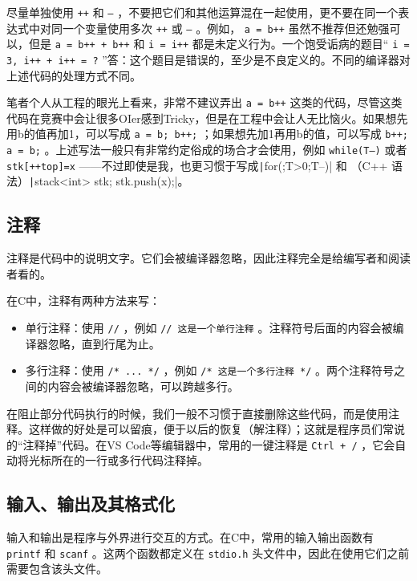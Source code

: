 \begin{caution}
  尽量单独使用 \texttt{++} 和 \texttt{--} ，不要把它们和其他运算混在一起使用，更不要在同一个表达式中对同一个变量使用多次 \texttt{++} 或 \texttt{--} 。例如， \texttt{a = b++} 虽然不推荐但还勉强可以，但是 \texttt{a = b++ + b++} 和 \texttt{i = i++} 都是未定义行为。一个饱受诟病的题目“ \texttt{i = 3, i++ + i++ = ?} ”答：这个题目是错误的，至少是不良定义的。不同的编译器对上述代码的处理方式不同。

  笔者个人从工程的眼光上看来，非常不建议弄出 \texttt{a = b++} 这类的代码，尽管这类代码在竞赛中会让很多OIer感到Tricky，但是在工程中会让人无比恼火。如果想先用b的值再加1，可以写成 \texttt{a = b; b++;} ；如果想先加1再用b的值，可以写成 \texttt{b++; a = b;} 。上述写法一般只有非常约定俗成的场合才会使用，例如 \texttt{while(T--)} 或者 \texttt{stk[++top]=x} ——不过即使是我，也更习惯于写成\texttt|for(;T>0;T--)| 和 （C++ 语法）\texttt|stack<int> stk; stk.push(x);|。
\end{caution}

\subsection{注释}

注释是代码中的说明文字。它们会被编译器忽略，因此注释完全是给编写者和阅读者看的。

在C中，注释有两种方法来写：
\begin{itemize}
  \item 单行注释：使用 \texttt{//} ，例如 \texttt{// 这是一个单行注释} 。注释符号后面的内容会被编译器忽略，直到行尾为止。
  \item 多行注释：使用 \texttt{/* ... */} ，例如 \texttt{/* 这是一个多行注释 */} 。两个注释符号之间的内容会被编译器忽略，可以跨越多行。
\end{itemize}

在阻止部分代码执行的时候，我们一般不习惯于直接删除这些代码，而是使用注释。这样做的好处是可以留痕，便于以后的恢复（解注释）；这就是程序员们常说的“注释掉”代码。在VS Code等编辑器中，常用的一键注释是 \texttt{Ctrl + /} ，它会自动将光标所在的一行或多行代码注释掉。

\subsection{输入、输出及其格式化}

输入和输出是程序与外界进行交互的方式。在C中，常用的输入输出函数有 \texttt{printf} 和 \texttt{scanf} 。这两个函数都定义在 \texttt{stdio.h} 头文件中，因此在使用它们之前需要包含该头文件。

